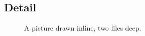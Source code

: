 \subsection{Detail}

\begin{figure}
  \caption{A picture drawn inline, two files deep.}
  \label{fig:deep-tikz}
\end{figure}
